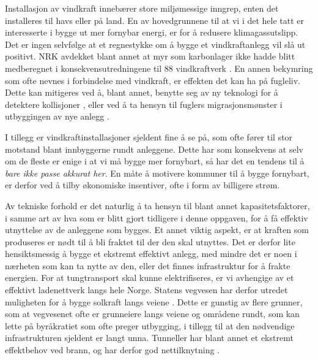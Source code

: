 \documentclass{article}
\begin{document}
Installasjon av vindkraft innebærer store miljømessige inngrep, enten det installeres til havs eller på land.
En av hovedgrunnene til at vi i det hele tatt er interesserte i bygge ut mer fornybar energi, er for å redusere klimagassutslipp.
Det er ingen selvfølge at et regnestykke om å bygge et vindkraftanlegg vil slå ut positivt.
NRK avdekket blant annet at myr som karbonlager ikke hadde blitt medberegnet i konsekvensutredningene til 88 vindkraftverk \cite{myr_vindkraft}.
En annen bekymring som ofte nevnes i forbindelse med vindkraft, er effekten det kan ha på fugleliv.
Dette kan mitigeres ved å, blant annet, benytte seg av ny teknologi for å detektere kollisjoner \cite{spoor}, eller ved å ta hensyn til fuglers migrasjonsmønster i utbyggingen av nye anlegg \cite{NINA_migration}.

I tillegg er vindkraftinstallasjoner sjeldent fine å se på, som ofte fører til stor motstand blant innbyggerne rundt anleggene.
Dette har som konsekvens at selv om de fleste er enige i at vi må bygge mer fornybart, så har det en tendens til å \textit{bare ikke passe akkurat her}.
En måte å motivere kommuner til å bygge fornybart, er derfor ved å tilby økonomiske insentiver, ofte i form av billigere strøm.

Av tekniske forhold er det naturlig å ta hensyn til blant annet kapasitetsfaktorer, i samme art av hva som er blitt gjort tidligere i denne oppgaven, for å få effektiv utnyttelse av de anleggene som bygges.
Et annet viktig aspekt, er at kraften som produseres er nødt til å bli fraktet til der den skal utnyttes.
Det er derfor lite hensiktsmessig å bygge et ekstremt effektivt anlegg, med mindre det er noen i nærheten som kan ta nytte av den, eller det finnes infrastruktur for å frakte energien.
For at tungtransport skal kunne elektrifiseres, er vi avhengige av et effektivt ladenettverk langs hele Norge.
Statens vegvesen har derfor utredet muligheten for å bygge solkraft langs veiene \cite{vegvesen}.
Dette er gunstig av flere grunner, som at vegvesenet ofte er grunneiere langs veiene og områdene rundt, som kan lette på byråkratiet som ofte preger utbygging, i tillegg til at den nødvendige infrastrukturen sjeldent er langt unna.
Tunneller har blant annet et ekstremt effektbehov ved brann, og har derfor god nettilknytning \cite{edvard}.




\appendix
\end{document}
